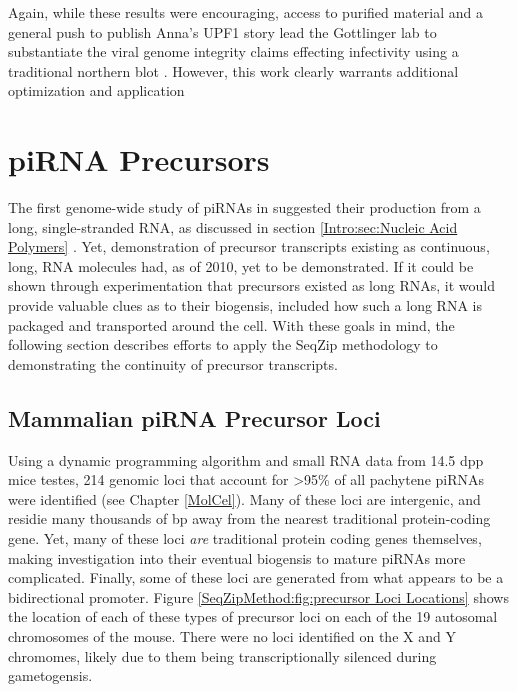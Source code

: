     Again, while these results were encouraging, access to purified material and a general push to publish Anna's UPF1 story lead the Gottlinger lab to substantiate the viral genome integrity claims effecting infectivity using a traditional northern blot \citep{Serquina2013}. However, this work clearly warrants additional optimization and application

\section{piRNA Precursors}
  \label{SeqZipMethod:sec:Demonstrating continuous precursor TX by SeqZip}

  The first genome-wide study of piRNAs in \flies{} suggested their production from a long, single-stranded RNA, as discussed in section \ref{Intro:sec:Nucleic Acid Polymers} \citep{Brennecke2007,Gunawardane2007}. Yet, demonstration of precursor transcripts existing as continuous, long, RNA molecules had, as of 2010, yet to be demonstrated. If it could be shown through experimentation that precursors existed as long RNAs, it would provide valuable clues as to their biogensis, included how such a long RNA is packaged and transported around the cell. With these goals in mind, the following section describes efforts to apply the SeqZip methodology to demonstrating the continuity of precursor transcripts.

  \subsection{Mammalian piRNA Precursor Loci}
    \label{SeqZipMethod:subsec:Mammalian Loci of precursor Tx}

    Using a dynamic programming algorithm and small RNA data from 14.5 dpp mice testes, 214 genomic loci that account for >95\% of all pachytene piRNAs were identified (see Chapter \ref{MolCel}). Many of these loci are intergenic, and residie many thousands of bp away from the nearest traditional protein-coding gene. Yet, many of these loci \textit{are} traditional protein coding genes themselves, making investigation into their eventual biogensis to mature piRNAs more complicated. Finally, some of these loci are generated from what appears to be a bidirectional promoter. Figure \ref{SeqZipMethod:fig:precursor Loci Locations} shows the location of each of these types of precursor loci on each of the 19 autosomal chromosomes of the mouse. There were no loci identified on the X and Y chromomes, likely due to them being transcriptionally silenced during gametogensis. 

